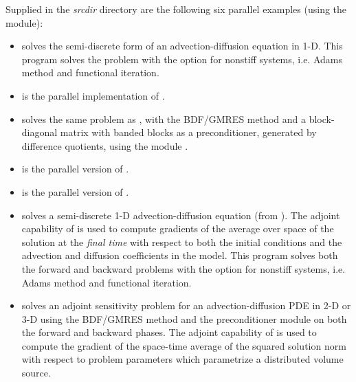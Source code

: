 
\vspace{0.2in}\noindent 
Supplied in the {\em srcdir} directory are
the following six parallel examples (using the {\nvecp} module):

\begin{itemize}


\item {}
  solves the semi-discrete form of an advection-diffusion equation in 1-D.
  \newline
  This program solves the problem with the option for nonstiff systems,
  i.e. Adams method and functional iteration.
\item {}
  is the parallel implementation of .
\item {}
  solves the same problem as , with the BDF/GMRES method 
  and a block-diagonal matrix with banded blocks as a preconditioner, 
  generated by difference quotients, using the module {\cvbbdpre}.


\item {}
  is the parallel version of .
\item {}
  is the parallel version of .

\item {}
  solves a semi-discrete 1-D advection-diffusion equation (from ).
  \newline
  The adjoint capability of {\cvodes} is used to compute gradients
  of the average over space of the solution at the {\em final time} with
  respect to both the initial conditions and the advection and
  diffusion coefficients in the model.
  This program solves both the forward and backward problems with the option 
  for nonstiff systems, i.e. Adams method and functional iteration.
\item {}
  solves an adjoint sensitivity problem for an advection-diffusion PDE in 2-D 
  or 3-D using the BDF/GMRES method and the {\cvbbdpre} preconditioner module
  on both the forward and backward phases.
  \newline
  The adjoint capability of {\cvodes} is used to compute the gradient of the
  space-time average of the squared solution norm with respect to problem 
  parameters which parametrize a distributed volume source.

\end{itemize}

